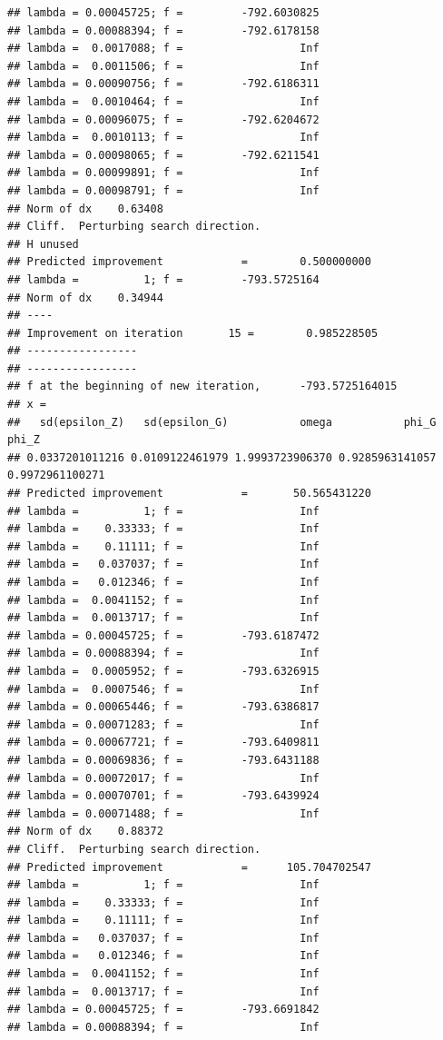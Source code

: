 \documentclass[12pt,a4paper,]{article}
\newcommand{\0}{\mathbf{0}}
\begin{document}
\begin{verbatim}
## lambda = 0.00045725; f =         -792.6030825 
## lambda = 0.00088394; f =         -792.6178158 
## lambda =  0.0017088; f =                  Inf 
## lambda =  0.0011506; f =                  Inf 
## lambda = 0.00090756; f =         -792.6186311 
## lambda =  0.0010464; f =                  Inf 
## lambda = 0.00096075; f =         -792.6204672 
## lambda =  0.0010113; f =                  Inf 
## lambda = 0.00098065; f =         -792.6211541 
## lambda = 0.00099891; f =                  Inf 
## lambda = 0.00098791; f =                  Inf 
## Norm of dx    0.63408
## Cliff.  Perturbing search direction. 
## H unused
## Predicted improvement            =        0.500000000
## lambda =          1; f =         -793.5725164 
## Norm of dx    0.34944
## ----
## Improvement on iteration       15 =        0.985228505
## -----------------
## -----------------
## f at the beginning of new iteration,      -793.5725164015 
## x =
##   sd(epsilon_Z)   sd(epsilon_G)           omega           phi_G           phi_Z 
## 0.0337201011216 0.0109122461979 1.9993723906370 0.9285963141057 0.9972961100271 
## Predicted improvement            =       50.565431220
## lambda =          1; f =                  Inf 
## lambda =    0.33333; f =                  Inf 
## lambda =    0.11111; f =                  Inf 
## lambda =   0.037037; f =                  Inf 
## lambda =   0.012346; f =                  Inf 
## lambda =  0.0041152; f =                  Inf 
## lambda =  0.0013717; f =                  Inf 
## lambda = 0.00045725; f =         -793.6187472 
## lambda = 0.00088394; f =                  Inf 
## lambda =  0.0005952; f =         -793.6326915 
## lambda =  0.0007546; f =                  Inf 
## lambda = 0.00065446; f =         -793.6386817 
## lambda = 0.00071283; f =                  Inf 
## lambda = 0.00067721; f =         -793.6409811 
## lambda = 0.00069836; f =         -793.6431188 
## lambda = 0.00072017; f =                  Inf 
## lambda = 0.00070701; f =         -793.6439924 
## lambda = 0.00071488; f =                  Inf 
## Norm of dx    0.88372
## Cliff.  Perturbing search direction. 
## Predicted improvement            =      105.704702547
## lambda =          1; f =                  Inf 
## lambda =    0.33333; f =                  Inf 
## lambda =    0.11111; f =                  Inf 
## lambda =   0.037037; f =                  Inf 
## lambda =   0.012346; f =                  Inf 
## lambda =  0.0041152; f =                  Inf 
## lambda =  0.0013717; f =                  Inf 
## lambda = 0.00045725; f =         -793.6691842 
## lambda = 0.00088394; f =                  Inf 

\end{verbatim}
\end{document}
